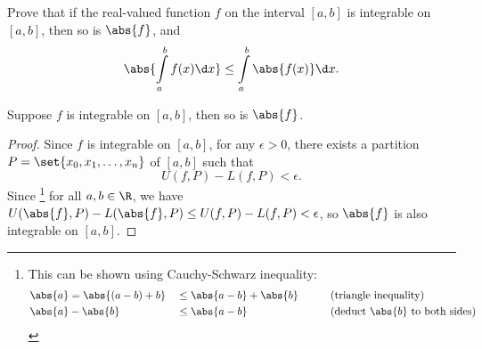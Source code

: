 \begin{problem}
  Prove that if the real-valued function $f$ on the interval $[a, b]$
  is integrable on $[a, b]$, then so is $\abs{f}$, and
  \[
    \abs{\int\limits_a^b f(x) \d x} \leq \int\limits_a^b \abs{f(x)} \d x.
  \]
\end{problem}

  \begin{claim}
    Suppose $f$ is integrable on $[a, b]$, then so is $\abs{f}$.
  \end{claim}
  \begin{proof}
    Since $f$ is integrable on $[a, b]$, for any $\epsilon > 0$,
    there exists a partition $P = \set{x_0, x_1, \ldots, x_n}$ of $[a, b]$
    such that
    \[ U(f, P) - L(f, P) < \epsilon. \]
    Since \footnote{
      This can be shown using Cauchy-Schwarz inequality:
      \begin{alignat*}{5}
        &\abs{a} = \abs{(a - b) + b} &&\leq \abs{a - b} + \abs{b}
          &&\qquad \text{(triangle inequality)}\\
        &\abs{a} - \abs{b} &&\leq \abs{a - b} &&\qquad \text{(deduct $\abs{b}$ to both sides)}
      \end{alignat*}
    }
    for all $a, b \in \R$, we have
    $U(\abs{f}, P) - L(\abs{f}, P) \leq U(f, P) - L(f, P) < \epsilon$,
    so $\abs{f}$ is also integrable on $[a, b]$.
  \end{proof}

